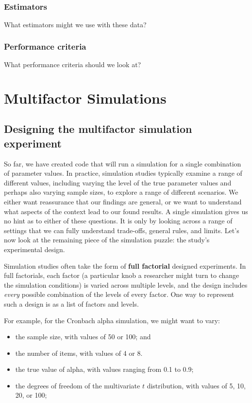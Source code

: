 \documentclass[
]{book}
\providecommand{\tightlist}{%
  \setlength{\itemsep}{0pt}\setlength{\parskip}{0pt}}
\begin{document}
\section{Estimators}\label{estimators}

What estimators might we use with these data?

\section{Performance criteria}\label{performance-criteria-1}

What performance criteria should we look at?

\part{Multifactor Simulations}\label{part-multifactor-simulations}

\chapter{Designing the multifactor simulation experiment}\label{exp-design}

So far, we have created code that will run a simulation for a single combination of parameter values.
In practice, simulation studies typically examine a range of different values, including varying the level of the true parameter values and perhaps also varying sample sizes, to explore a range of different scenarios.
We either want reassurance that our findings are general, or we want to understand what aspects of the context lead to our found results.
A single simulation gives us no hint as to either of these questions.
It is only by looking across a range of settings that we can fully understand trade-offs, general rules, and limits.
Let's now look at the remaining piece of the simulation puzzle: the study's experimental design.

Simulation studies often take the form of \textbf{full factorial} designed experiments. In full factorials, each factor (a particular knob a researcher might turn to change the simulation conditions) is varied across multiple levels, and the design includes \emph{every} possible combination of the levels of every factor. One way to represent such a design is as a list of factors and levels.

For example, for the Cronbach alpha simulation, we might want to vary:

\begin{itemize}
\tightlist
\item
  the sample size, with values of 50 or 100; and
\item
  the number of items, with values of 4 or 8.
\item
  the true value of alpha, with values ranging from 0.1 to 0.9;
\item
  the degrees of freedom of the multivariate \(t\) distribution, with values of 5, 10, 20, or 100;
\end{itemize}
\end{document}
